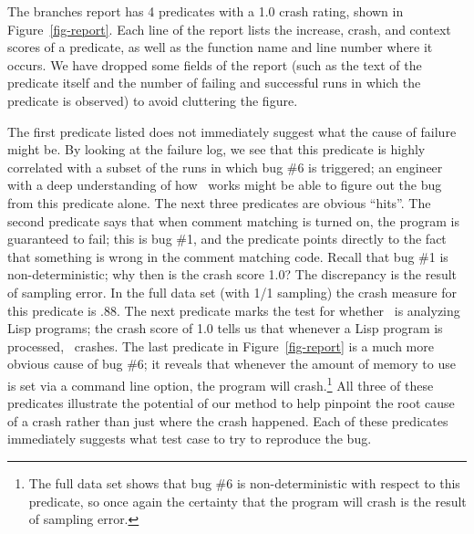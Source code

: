 
The branches report has 4 predicates with a 1.0 crash rating, shown
in Figure~\ref{fig-report}.  Each line of the report lists the
increase, crash, and context scores of a predicate, as well as the 
function name and line number where it occurs.  We have dropped some fields of the report (such as the text of the predicate itself and the number of failing and successful runs in which the predicate is observed) to avoid cluttering the
figure.

The first predicate listed does not immediately suggest what the cause
of failure might be. By looking at the failure log, we see that this predicate
is highly correlated with a subset of the runs in which bug \#6 is
triggered; an engineer with a deep understanding of how \moss\ works
might be able to figure out the bug from this predicate alone.
The next three predicates are obvious ``hits''. The second predicate
says that when comment matching is turned on, the program is
guaranteed to fail; this is bug \#1, and the predicate points directly
to the fact that something is wrong in the comment matching code.
Recall that bug \#1 is non-deterministic; why then is the crash score 1.0?
The discrepancy is the result of sampling error.  In the full data set
(with 1/1 sampling) the crash measure for this predicate is .88.  The
next predicate marks the test for whether \moss\ is analyzing Lisp
programs; the crash score of 1.0 tells us that whenever a Lisp program is
processed, \moss\ crashes.  The last predicate in
Figure~\ref{fig-report} is a much more obvious cause of 
bug \#6; it reveals that whenever the amount of memory to use is set
via a command line option, the program will crash.\footnote{The full data set shows that bug \#6 is non-deterministic with respect to this predicate, so once again the certainty that the program will crash is the result of sampling error.}  All three of these predicates illustrate the potential of our method to
help pinpoint the root cause of a crash rather than just where the crash
happened.  Each of these predicates immediately suggests
what test case to try to reproduce the bug. 

